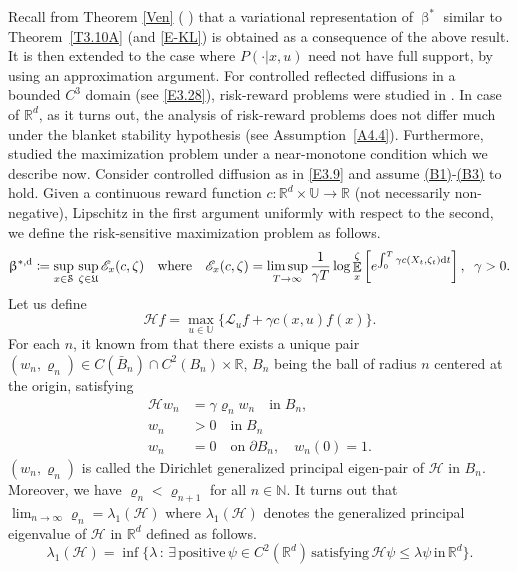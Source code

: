 \documentclass[notitlepage,11pt,reqno]{amsart}
\numberwithin{equation}{section}
\theoremstyle{plain}
\theoremstyle{definition}
\theoremstyle{remark}
\newcommand{\Act}{{\mathds{U}}}
\newcommand{\sE}{{\mathscr{E}}}     %
\newcommand{\sH}{{\mathscr{H}}}
\newcommand{\sL}{{\mathscr{L}}}
\newcommand{\cS}{{\mathcal{S}}}     %
\newcommand{\Uadm}{\mathfrak{U}}
\newcommand{\RR}{\mathds{R}} %
\newcommand{\NN}{\mathds{N}} %
\newcommand{\Rd}{{\mathds{R}^{d}}}
\DeclareMathOperator{\Exp}{\mathbb{E}} %
\newcommand{\D}{\mathrm{d}} %
\newcommand{\df}{\coloneqq}
\begin{document}
Recall from Theorem \ref{Ven} ( \cite[Theorem~3.2]{MR3629428}) that a variational representation of $\upbeta^*$ similar to Theorem~\ref{T3.10A} (and \eqref{E-KL}) is obtained as a consequence of the above result. It is then extended to the case where $P( \cdot |x,u)$ need not have full support, by using an approximation argument.  
For controlled reflected diffusions in a bounded $C^3$ domain (see \eqref{E3.28}), risk-reward problems were studied in \cite[Theorem~2.1]{MR4188837}. 
In case of $\Rd$, as it turns out, the analysis of risk-reward problems does not differ much under the blanket stability hypothesis (see Assumption~\ref{A4.4}). Furthermore, \cite{MR4188837}
studied the maximization problem under a near-monotone condition which we describe now. 
Consider controlled diffusion as in \eqref{E3.9} and assume \hyperlink{B1}{(B1)}-\hyperlink{B3}{(B3)} to hold. Given a continuous reward function $c:\Rd\times\Act\to\RR$ (not necessarily non-negative),
Lipschitz in the first argument uniformly with respect to the second,
we define the risk-sensitive maximization problem as follows.
\begin{equation}\label{risk-reward-diff}
\upbeta^{*,{\rm d}}\df \sup_{x\in\cS}\, \sup_{\zeta\in\Uadm}\sE_x(c, \zeta)
\quad \text{where}\quad 
\sE_x(c, \zeta)=\limsup_{T\to\infty}\frac{1}{\gamma T}\log\Exp_x^\zeta\left[e^{\int_0^T \gamma c(X_t, \zeta_t)\D{t}}\right], \; \; \gamma>0.
\end{equation}
Let us define
$$\sH f =\max_{u\in\Act}\{\sL_u f + \gamma c(x, u) f(x)\}.$$
For each $n$, it known from \cite{MR2409410} that there exists a unique pair $(w_n, \varrho_n)\in C(\bar{B}_n)\cap C^2(B_n)\times\RR$, $B_n$ being the ball of radius $n$ centered at the origin, satisfying
\begin{equation}\label{E5.2}
\begin{split}
\sH w_n &=\gamma \varrho_n w_n \quad \text{in}\; B_n,
\\
w_n &>0 \quad \text{in}\; B_n
\\
w_n &=0 \quad \text{on}\; \partial B_n, \quad w_n(0)=1.
\end{split}
\end{equation}
$(w_n, \varrho_n)$ is called the  Dirichlet generalized principal eigen-pair of $\sH$ in $B_n$. Moreover, we have $\varrho_n<\varrho_{n+1}$ for all $n\in\NN$. It turns out that $\lim_{n\to\infty}\varrho_n=\lambda_1(\sH)$
where $\lambda_1(\sH)$ denotes the generalized principal eigenvalue 
of $\sH$ in $\Rd$ defined as follows.
$$
\lambda_{1}(\sH)=\inf\{\lambda\, :\, \exists\, \text{positive}\, \psi\in C^2(\Rd)\, \text{satisfying} \, \sH\psi\leq \lambda\psi\, \text{in}\, \Rd \}.
$$
\end{document}
